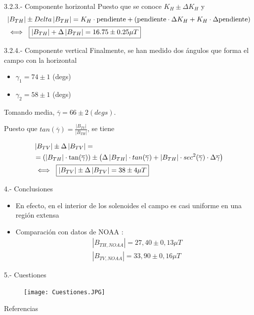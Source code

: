\documentclass{beamer}
\makeatletter
\providecommand{\abs}[1]{\left|#1\right|}
\newcommand{\commentedbox}[2]{%
  \mbox{
    \begin{tabular}[t]{@{}c@{}}
    $\boxed{\displaystyle#1}$\\
    #2
    \end{tabular}%
  }%
}
\makeatother
\begin{document}
\begin{frame}{3.2.3.- Componente horizontal}
    Puesto que se conoce $K_{H} \pm \Delta K_{H}$ y \pause
    \begin{align*}
        &\abs{B_{TH}} \pm Delta \abs{B_{TH}} = K_{H} \cdot \text{pendiente} + (\text{pendiente} \cdot \Delta K_{H} + K_{H} \cdot \Delta \text{pendiente}) \nonumber \\
        &\iff \commentedbox{\abs{B_{TH}} + \Delta \abs{B_{TH}} = 16.75 \pm 0.25 \mu T }{}
    \end{align*}
\end{frame}
\begin{frame}{3.2.4.- Componente vertical}
Finalmente, se han medido dos ángulos que forma el campo con la horizontal
\begin{itemize}
\item $\gamma_{1} = 74 \pm 1$ (degs)
\item $\gamma_{2} = 58 \pm 1$ (degs)
\end{itemize}
\pause Tomando media, $\overline{\gamma} = 66 \pm 2 (degs)$. \pause

Puesto que $tan(\overline{\gamma}) = \frac{\abs{B_{TV}}}{\abs{B_{TH}}}$, se tiene \pause

\begin{align*}
& \abs{B_{TV}} \pm \Delta \abs{B_{TV}} = \\
& = (\abs{B_{TH}} \cdot \tan(\overline{\gamma})) \pm \left( \Delta \abs{B_{TH}} \cdot tan(\overline{\gamma}) + \abs{B_{TH}} \cdot sec^{2}(\overline{\gamma}) \cdot \Delta \overline{\gamma} \right) \\
& \iff \commentedbox{\abs{B_{TV}} \pm \Delta \abs{B_{TV}} = 38 \pm 4 \mu T}{}
\end{align*}
\end{frame}
\begin{frame}{4.- Conclusiones}
\begin{itemize}
\item En efecto, en el interior de los solenoides el campo es casi uniforme en una región extensa
\item Comparación con datos de NOAA \cite{NOAA}:
\begin{align*}
 & \abs{B_{TH,NOAA}} = 27,40 \pm 0,13 \mu T \\
 & \abs{B_{TV,NOAA}} = 33,90 \pm 0,16 \mu T \nonumber
\end{align*}
\end{itemize}
\end{frame}
\begin{frame}{5.- Cuestiones}
\begin{figure}
        \centering
        \texttt{[image: Cuestiones.JPG]}
    \end{figure}
\end{frame}
\begin{frame}{Referencias}


\end{frame}
\end{document}
